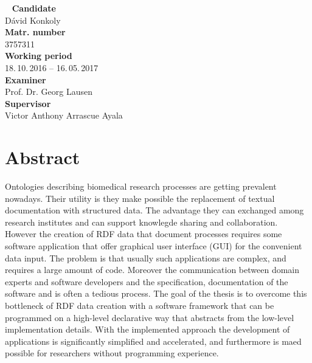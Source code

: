 


%
\newpage
~\vfill
\noindent \textbf{Candidate}\smallskip{}
\\
Dávid Konkoly \smallskip{}
\\
\noindent \textbf{Matr. number}\smallskip{}
\\
3757311 \smallskip{}
\\
\textbf{Working period}\smallskip{}
\\
18.\,10.\,2016 -- 16.\,05.\,2017 \smallskip{}
\\
\textbf{Examiner}\smallskip{}
\\
Prof. Dr. Georg Lausen\smallskip{}
\\
\textbf{Supervisor}\smallskip{}
\\
Victor Anthony Arrascue Ayala\\

\newpage
\chapter*{Abstract}


Ontologies describing biomedical research processes are getting prevalent nowadays.  Their utility is they make possible the replacement of textual documentation with structured data. The advantage they can exchanged among research institutes and can support knowlegde sharing and collaboration. However the creation of RDF data that document processes requires some software application that offer graphical user interface (GUI) for the convenient data input. The problem is that usually such applications are complex, and requires a large amount of code. Moreover the communication between domain experts and software developers and the specification, documentation of the software and is often a tedious process. The goal of the thesis is to overcome this bottleneck of RDF data creation with a software framework that can be programmed on a high-level declarative way that abstracts from the low-level implementation details. With the implemented approach the development of applications is significantly simplified and accelerated, and furthermore is maed possible for researchers without programming experience.



